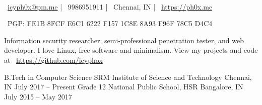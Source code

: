 \documentclass[]{awesome-cv}
\begin{document}
    
\begin{center}
	  \\
	\vspace{2mm}
	{\faEnvelope\ \href{mailto:icyph0x@pm.me}{icyph0x@pm.me}} | {\faMobile\ 9986951911} | {\faMapMarker\ Chennai, IN} | {\faLink\ \url{https://ph0x.me}}
	\begin{center}
		{\faKey\ PGP: FE1B 8FCF E6C1 6222 F157 1C8E 8A93 F96F 78C5 D4C4}
	\end{center} 
\end{center} 
\begin{center}
	Information security researcher, semi-professional penetration tester, and web developer. I love Linux, free software and minimalism. View my projects and code at
	{\faGithub\ \url{https://github.com/icyphox}}
\end{center}
\begin{cventries}
	\cventry
	{B.Tech in Computer Science}
	{SRM Institute of Science and Technology}
	{Chennai, IN}
	{July 2017 – Present}
	{}
	\cventry
	{Grade 12}
	{National Public School, HSR}
	{Bangalore, IN}
	{July 2015 – May 2017}
	{}
\end{cventries}
\end{document}
